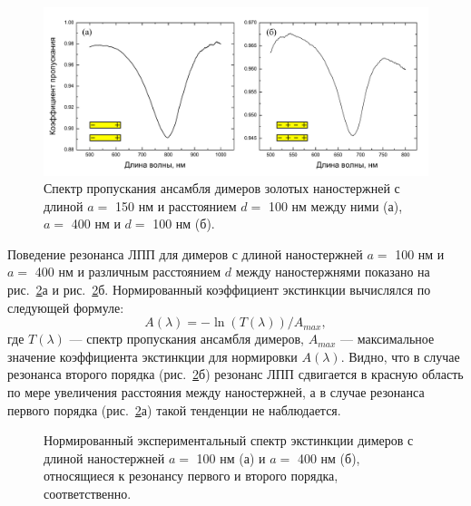 \begin{figure}[!h]
\centering
\includegraphics[width=1\linewidth]{img/microspectroscopy/spectra_1-2res.pdf}
\caption{Спектр пропускания ансамбля димеров золотых наностержней с длиной $ a = $ 150 нм и расстоянием $ d = $  100 нм между ними (а), $ a = $ 400 нм и $ d = $ 100 нм (б).}
\label{img:spectra}
\end{figure}

Поведение резонанса ЛПП для димеров с длиной наностержней $ a = $ 100 нм и $ a = $ 400 нм и различным расстоянием $ d $ между наностержнями показано на рис.~\ref{img:extinction}а и рис.~\ref{img:extinction}б. Нормированный коэффициент экстинкции вычислялся по следующей формуле:
\begin{equation}
A(\lambda) = - \ln (T(\lambda))/A_{max},
\end{equation}
где $ T(\lambda) $ --- спектр пропускания ансамбля димеров, $ A_{max} $ --- максимальное значение коэффициента экстинкции для нормировки $ A(\lambda) $. Видно, что в случае резонанса второго порядка (рис.~\ref{img:extinction}б) резонанс ЛПП сдвигается в красную область по мере увеличения расстояния между наностержней, а в случае резонанса первого порядка (рис.~\ref{img:extinction}а) такой тенденции не наблюдается.
\begin{figure}
\caption{Нормированный экспериментальный спектр экстинкции димеров с длиной наностержней $ a = $ 100 нм (а) и $ a = $ 400 нм (б), относящиеся к резонансу первого и второго порядка, соответственно.}
\label{img:extinction}
\end{figure}

